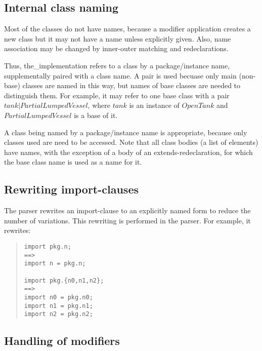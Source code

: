 \documentclass[10pt,b5paper]{article}
\begin{document}

\subsection{Internal class naming}

Most of the classes do not have names, because a modifier application
creates a new class but it may not have a name unless explicitly
given.  Also, name association may be changed by inner-outer matching
and redeclarations.

Thus, the_implementation refers to a class by a package/instance name,
supplementally paired with a class name.  A pair is used becuase only
main (non-base) classes are named in this way, but names of base
classes are needed to distinguish them.  For example, it may refer to
one base class with a pair
$\mathit{tank}|\mathit{PartialLumpedVessel}$, where $\mathit{tank}$ is
an instance of $\mathit{OpenTank}$ and $\mathit{PartialLumpedVessel}$
is a base of it.

A class being named by a package/instance name is appropriate, because
only classes used are need to be accessed.  Note that all class bodies
(a list of elements) have names, with the exception of a body of an
extends-redeclaration, for which the base class name is used as a name
for it.


\subsection{Rewriting import-clauses}

The parser rewrites an import-clause to an explicitly named form to
reduce the number of variations.  This rewriting is performed in the
parser.  For example, it rewrites:
\begin{quote}
\begin{lstlisting}[aboveskip=-\baselineskip]
import pkg.n;
==>
import n = pkg.n;

import pkg.{n0,n1,n2};
==>
import n0 = pkg.n0;
import n1 = pkg.n1;
import n2 = pkg.n2;
\end{lstlisting}
\end{quote}


\subsection{Handling of modifiers}
\end{document}
